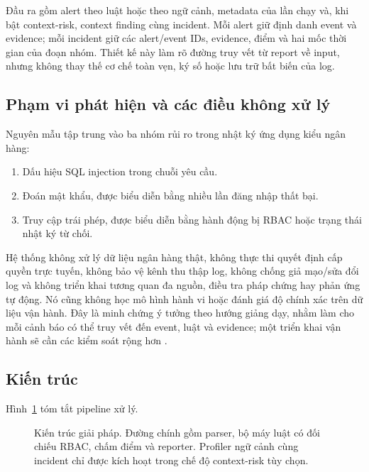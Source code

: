 Đầu ra gồm alert theo luật hoặc theo ngữ cảnh, metadata của lần chạy và, khi
bật context-risk, context finding cùng incident. Mỗi alert giữ định danh event
và evidence; mỗi incident giữ các alert/event IDs, evidence, điểm và hai mốc
thời gian của đoạn nhóm. Thiết kế này làm rõ đường truy vết từ report về input,
nhưng không thay thế cơ chế toàn vẹn, ký số hoặc lưu trữ bất biến của log.

\subsection{Phạm vi phát hiện và các điều không xử lý}
\label{subsec:scope-limitations}

Nguyên mẫu tập trung vào ba nhóm rủi ro trong nhật ký ứng dụng kiểu ngân hàng:

\begin{enumerate}
  \item Dấu hiệu SQL injection trong chuỗi yêu cầu.
  \item Đoán mật khẩu, được biểu diễn bằng nhiều lần đăng nhập thất bại.
  \item Truy cập trái phép, được biểu diễn bằng hành động bị RBAC hoặc trạng
  thái nhật ký từ chối.
\end{enumerate}

Hệ thống không xử lý dữ liệu ngân hàng thật, không thực thi quyết định cấp quyền
trực tuyến, không bảo vệ kênh thu thập log, không chống giả mạo/sửa đổi log và
không triển khai tương quan đa nguồn, điều tra pháp chứng hay phản ứng tự động.
Nó cũng không học mô hình hành vi hoặc đánh giá độ chính xác trên dữ liệu vận
hành. Đây là minh chứng ý tưởng theo hướng giảng dạy, nhằm làm cho mỗi cảnh báo
có thể truy vết đến event, luật và evidence; một triển khai vận hành sẽ cần các
kiểm soát rộng hơn \citep{Rose2020SP800207,JTF2020SP80053}.

\subsection{Kiến trúc}
\label{subsec:architecture}

Hình~\ref{fig:architecture} tóm tắt pipeline xử lý.

\begin{figure}[t]
  \centering
  \resizebox{\linewidth}{!}{}
  \caption{Kiến trúc giải pháp. Đường chính gồm parser, bộ máy luật có đối
  chiếu RBAC, chấm điểm và reporter. Profiler ngữ cảnh cùng incident chỉ được
  kích hoạt trong chế độ context-risk tùy chọn.}
  \label{fig:architecture}
\end{figure}

